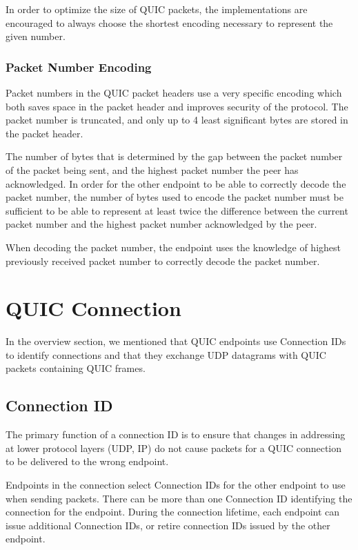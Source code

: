 In order to optimize the size of QUIC packets, the implementations are encouraged to always choose
the shortest encoding necessary to represent the given number.

\subsubsection{Packet Number Encoding}\label{sec:packet-number-encoding}

Packet numbers in the QUIC packet headers use a very specific encoding which both saves space in the
packet header and improves security of the protocol. The packet number is truncated, and only up to
4 least significant bytes are stored in the packet header.

The number of bytes that is determined by the gap between the packet number of the packet being
sent, and the highest packet number the peer has acknowledged. In order for the other endpoint to be
able to correctly decode the packet number, the number of bytes used to encode the packet number
must be sufficient to be able to represent at least twice the difference between the current packet
number and the highest packet number acknowledged by the peer.

When decoding the packet number, the endpoint uses the knowledge of highest previously received
packet number to correctly decode the packet number.


\section{QUIC Connection}

In the overview section, we mentioned that QUIC endpoints use Connection IDs to identify connections
and that they exchange UDP datagrams with QUIC packets containing QUIC frames.

\subsection{Connection ID}

The primary function of a connection ID is to ensure that changes in addressing at lower protocol
layers (UDP, IP) do not cause packets for a QUIC connection to be delivered to the wrong endpoint.

Endpoints in the connection select Connection IDs for the other endpoint to use when sending
packets. There can be more than one Connection ID identifying the connection for the endpoint.
During the connection lifetime, each endpoint can issue additional Connection IDs, or retire
connection IDs issued by the other endpoint.

